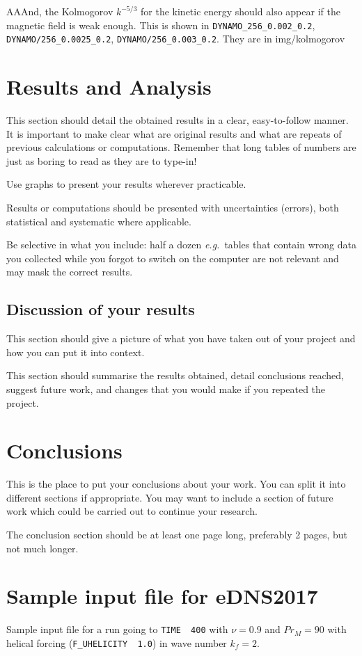 \documentclass[12pt,a4paper]{report}
\begin{document}
AAAnd, the Kolmogorov $k^{-5/3}$ for the kinetic energy should also appear if the magnetic field is weak enough. This is shown in \texttt{DYNAMO\_256\_0.002\_0.2}, \texttt{DYNAMO/256\_0.0025\_0.2}, \texttt{DYNAMO/256\_0.003\_0.2}. They are in {img/kolmogorov}





\chapter{Results and Analysis}

This section should detail the obtained results in a clear,
easy-to-follow manner. It is important to make clear what are original
results and what are repeats of previous calculations or computations.
Remember that long tables of numbers are just as boring to read as
they are to type-in!

Use graphs to present your results wherever practicable.

Results or computations should be presented with uncertainties
(errors), both statistical and systematic where applicable.

Be selective in what you include: half a dozen \emph{e.g.}~tables that
contain wrong data you collected while you forgot to switch on the
computer are not relevant and may mask the correct results.

\section{Discussion of your results}

This section should give a picture of what you have taken out of your
project and how you can put it into context.

This section should summarise the results obtained, detail conclusions
reached, suggest future work, and changes that you would make if you
repeated the project.

\chapter{Conclusions}

This is the place to put your conclusions about your work. You can
split it into different sections if appropriate. You may want to include
a section of future work which could be carried out to continue your
research.

The conclusion section should be at least one page long, preferably 2
pages, but not much longer.

\appendix
\chapter{Sample input file for eDNS2017}
\label{apx1}

Sample input file for a run going to \texttt{TIME~~400} with $\nu=0.9$ and $Pr_M=90$ with helical forcing (\texttt{F\_UHELICITY~~1.0}) in wave number $k_f=2$.







\end{document}
